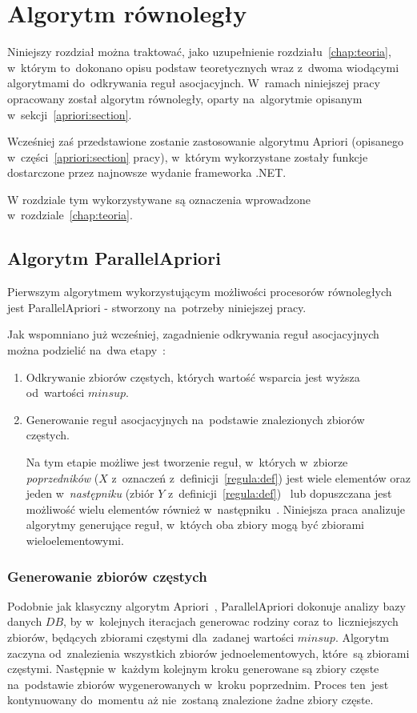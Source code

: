 \chapter{Algorytm równoległy\label{chap:algorytm}}

Niniejszy rozdział można traktować, jako uzupełnienie rozdziału~\ref{chap:teoria}, w~którym to~dokonano opisu podstaw teoretycznych wraz z~dwoma wiodącymi algorytmami do~odkrywania reguł asocjacyjnch. W~ramach niniejszej pracy opracowany został algorytm równoległy, oparty na~algorytmie opisanym w~sekcji~\ref{apriori:section}.

Wcześniej zaś przedstawione zostanie zastosowanie algorytmu Apriori (opisanego w~części~\ref{apriori:section} pracy), w~którym wykorzystane zostały funkcje dostarczone przez najnowsze wydanie frameworka .NET. 

W rozdziale tym wykorzystywane są oznaczenia wprowadzone w~rozdziale~\ref{chap:teoria}.

\section{Algorytm ParallelApriori\label{sec:papriori}}
Pierwszym algorytmem wykorzystującym możliwości procesorów równoległych jest ParallelApriori - stworzony na~potrzeby niniejszej pracy. 

Jak wspomniano już wcześniej, zagadnienie odkrywania reguł asocjacyjnych można podzielić na~dwa etapy~\cite{Problem:Statement}:
\begin{enumerate}
	\item Odkrywanie zbiorów częstych, których wartość wsparcia jest wyższa od~wartości $minsup$.
	\item Generowanie reguł asocjacyjnych na~podstawie znalezionych zbiorów częstych.

	Na tym etapie możliwe jest tworzenie reguł, w~których w~zbiorze \emph{poprzedników} ($X$ z~oznaczeń z~definicji~\ref{regula:def}) jest wiele elementów oraz jeden w~\emph{następniku} (zbiór $Y$ z~definicji~\ref{regula:def})~\cite{Problem:Statement} lub dopuszczana jest możliwość wielu elementów również w~następniku~\cite{Apriori:Main}. Niniejsza praca analizuje algorytmy generujące reguł, w~któych oba zbiory mogą być zbiorami wieloelementowymi.
\end{enumerate}

\subsection{Generowanie zbiorów częstych}\label{papriori:gen}
Podobnie jak klasyczny algorytm Apriori~\cite{Apriori:Main}, ParallelApriori dokonuje analizy bazy danych $DB$, by w~kolejnych iteracjach generowac rodziny coraz to~liczniejszych zbiorów, będących zbiorami częstymi dla~zadanej wartości $minsup$. Algorytm zaczyna od~znalezienia wszystkich zbiorów jednoelementowych, które~są zbiorami częstymi. Następnie w~każdym kolejnym kroku generowane są zbiory częste na~podstawie zbiorów wygenerowanych w~kroku poprzednim. Proces ten~jest kontynuowany do~momentu aż nie~zostaną znalezione żadne zbiory częste.

